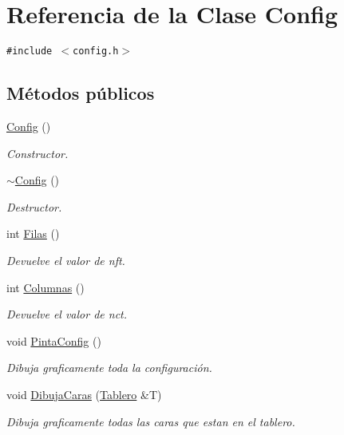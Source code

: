\hypertarget{class_config}{
\section{Referencia de la Clase Config}
\label{class_config}
}
{\tt \#include $<$config.h$>$}

\subsection*{Métodos públicos}
\begin{CompactItemize}
\item 
\hyperlink{class_config_bd0c571c116924871e30444b192b792a}{Config} ()
\begin{CompactList}\small\item\em Constructor. \item\end{CompactList}\item 
\hyperlink{class_config_543dce59b66475c5108088ee4ce1cdfc}{$\sim$Config} ()
\begin{CompactList}\small\item\em Destructor. \item\end{CompactList}\item 
int \hyperlink{class_config_63b35552c2db0e6bfadf386a6df6cc8b}{Filas} ()
\begin{CompactList}\small\item\em Devuelve el valor de nft. \item\end{CompactList}\item 
int \hyperlink{class_config_7f64981766eaccc7726295beb6e06d1a}{Columnas} ()
\begin{CompactList}\small\item\em Devuelve el valor de nct. \item\end{CompactList}\item 
void \hyperlink{class_config_38a07e218d50496b9b93e5bd4ab9956f}{PintaConfig} ()
\begin{CompactList}\small\item\em Dibuja graficamente toda la configuración. \item\end{CompactList}\item 
void \hyperlink{class_config_5861894c33eea7cec9523494912a295a}{DibujaCaras} (\hyperlink{class_tablero}{Tablero} \&T)
\begin{CompactList}\small\item\em Dibuja graficamente todas las caras que estan en el tablero. \item\end{CompactList}\item 

\end{CompactItemize}
